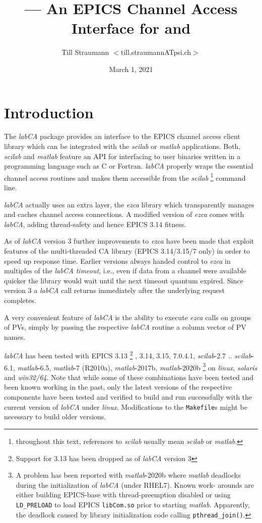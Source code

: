 \documentclass{article}
\title{\sca{} --- An EPICS Channel Access Interface for \scilab{} and \matlab{}}
\author{Till Straumann $<$till.straumannATpsi.ch$>$}
\date{March 1, 2021}
\newcommand{\sca}{\ita{labCA}}
\newcommand{\scilab}{\ita{scilab}}
\newcommand{\matlab}{\ita{matlab}}
\newcommand{\windoze}{\ita{win32/64}}
\newcommand{\ezca}{\ita{ezca}}
\newcommand{\com}[1]{{\tt #1}}
\newcommand{\ita}[1]{\emph{#1}}
\begin{document}
\maketitle
{\hspace*{\fill}{\small\gitstring}\hspace*{\fill}}
\section{Introduction}
The \sca{} package provides an interface to the
EPICS channel access client library which can be
integrated with the \scilab{} or \matlab{} applications.
Both, \scilab{} and \matlab{} feature an API for interfacing
to user binaries written in a programming language such
as C or Fortran. \sca{} properly wraps the essential
channel access routines and makes them accessible
from the \scilab%
\footnote{throughout this text, references to \scilab{}
usually mean \scilab{} or \matlab.}
command line.

\sca{} actually uses an extra layer, the \ezca{} library
which transparently manages and caches channel access 
connections. A modified version of \ezca{} comes with
\sca, adding thread-safety and hence EPICS 3.14 fitness.

As of \sca{} version 3 further improvements to \ezca{}
have been made that exploit features of the multi-threaded
CA library (EPICS 3.14/3.15/7 only) in order to speed up response time.
Earlier versions always handed control to \ezca{} in multiples of the
\sca{} \ita{timeout}, i.e., even if data from a channel
were available quicker the library would wait until the
next timeout quantum expired. Since version 3 a \sca{}
call returns immediately after the underlying request
completes.

A very convenient feature of \sca{} is the ability
to execute \ezca{} calls on groups of PVs, simply by
passing the respective \sca{} routine a column vector
of PV names.

\sca{} has been tested with EPICS 3.13%
\footnote{Support for 3.13 has been dropped as of \sca{} version 3}%
,
3.14, 3.15, 7.0.4.1, \scilab-2.7 .. \scilab-6.1,
\matlab-6.5, \matlab-7 (R2010a), \matlab-2017b, \matlab-2020b%
\footnote{A problem has been reported with \matlab-2020b where \matlab{}
deadlocks during the initialization of \sca{} (under RHEL7). Known work-
arounds are either building EPICS-base with thread-preemption disabled
or using {\tt LD\_PRELOAD} to load EPICS {\tt libCom.so} prior to starting
\matlab. Apparently, the deadlock caused by library initialization code
calling {\tt pthread\_join()}.
}
on \ita{linux}, \ita{solaris} and
\windoze. Note that while some of these combinations have been
tested and been known working in the past, only the latest
versions of the respective components have been tested
and verified to build and run successfully with the
current version of \sca{} under \ita{linux}.
Modifications to the \com{Makefile}s might be necessary to
build older versions.
\end{document}
